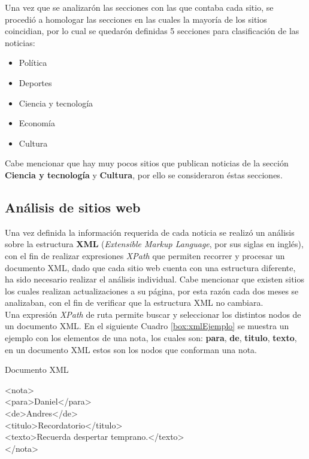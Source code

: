 Una vez que se analizarón las secciones con las que contaba cada sitio, se procedió a homologar las secciones en las cuales la mayoría de los sitios coincidian, por lo cual se quedarón definidas 5 secciones para clasificación de las noticias:

\begin{itemize}
    \item Política
    \item Deportes
    \item Ciencia y tecnología
    \item Economía
    \item Cultura
\end{itemize}

Cabe mencionar que hay muy pocos sitios que publican noticias de la sección \textbf{Ciencia y tecnología} y \textbf{Cultura}, por ello se consideraron éstas secciones.

\subsection{Análisis de sitios web}

Una vez definida la información requerida de cada noticia se realizó un análisis sobre la estructura \textbf{XML} (\textit{Extensible Markup Language}, por sus siglas en inglés), con el fin de realizar expresiones \textit{XPath} que permiten recorrer y procesar un documento XML, dado que cada sitio web cuenta con una estructura diferente, ha sido necesario realizar el análisis individual. Cabe mencionar que existen sitios los cuales realizan actualizaciones a su página, por esta razón cada dos meses se analizaban, con el fin de verificar que la estructura XML no cambiara.\\

Una expresión \textit{XPath} de ruta permite buscar y seleccionar los distintos nodos de un documento XML. En el siguiente Cuadro \ref{box:xmlEjemplo} se muestra un ejemplo con los elementos de una nota, los cuales son: \textbf{para}, \textbf{de}, \textbf{titulo}, \textbf{texto}, en un documento XML estos son los nodos que conforman una nota.\\

\begin{mygraybox}[label={box:xmlEjemplo}]{Documento XML}
\begin{tabbing}
<nota> \= \\\kill
\>	<para>Daniel</para>\\
\>	<de>Andres</de>\\
\>	<titulo>Recordatorio</titulo>\\
\>	<texto>Recuerda despertar temprano.</texto>\\
</nota>
\end{tabbing}
\end{mygraybox}

